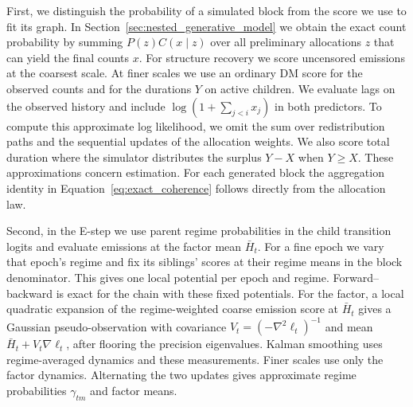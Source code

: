\documentclass[sigconf]{acmart}
\begin{document}
First, we distinguish the probability of a simulated block from the score we use to fit its graph. In Section~\ref{sec:nested_generative_model} we obtain the exact count probability by summing \(P(z)C(x\mid z)\) over all preliminary allocations \(z\) that can yield the final counts \(x\). For structure recovery we score uncensored emissions at the coarsest scale. At finer scales we use an ordinary DM score for the observed counts and for the durations \(Y\) on active children. We evaluate lags on the observed history and include \(\log(1+\sum_{j<i}x_j)\) in both predictors. To compute this approximate log likelihood, we omit the sum over redistribution paths and the sequential updates of the allocation weights. We also score total duration where the simulator distributes the surplus \(Y-X\) when \(Y\ge X\). These approximations concern estimation. For each generated block the aggregation identity in Equation~\eqref{eq:exact_coherence} follows directly from the allocation law.

Second, in the E-step we use parent regime probabilities in the child transition logits and evaluate emissions at the factor mean \(\bar H_t\). For a fine epoch we vary that epoch's regime and fix its siblings' scores at their regime means in the block denominator. This gives one local potential per epoch and regime. Forward--backward is exact for the chain with these fixed potentials. For the factor, a local quadratic expansion of the regime-weighted coarse emission score at \(\bar H_t\) gives a Gaussian pseudo-observation with covariance \(V_t=(-\nabla^2\ell_t)^{-1}\) and mean \(\bar H_t+V_t\nabla\ell_t\), after flooring the precision eigenvalues. Kalman smoothing uses regime-averaged dynamics and these measurements. Finer scales use only the factor dynamics. Alternating the two updates gives approximate regime probabilities \(\gamma_{tm}\) and factor means.
\end{document}
